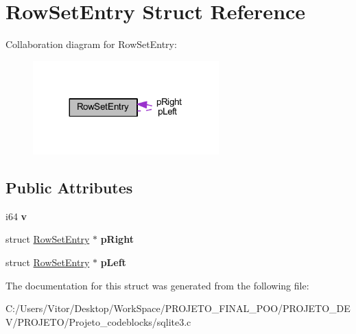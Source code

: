 \hypertarget{struct_row_set_entry}{\section{Row\-Set\-Entry Struct Reference}
\label{struct_row_set_entry}
}


Collaboration diagram for Row\-Set\-Entry\-:\nopagebreak
\begin{figure}[H]
\begin{center}
\leavevmode
\includegraphics[width=203pt]{struct_row_set_entry__coll__graph}
\end{center}
\end{figure}
\subsection*{Public Attributes}
\begin{DoxyCompactItemize}
\item 
\hypertarget{struct_row_set_entry_ac72670935246f1bff5e4d96703574071}{i64 {\bfseries v}}\label{struct_row_set_entry_ac72670935246f1bff5e4d96703574071}

\item 
\hypertarget{struct_row_set_entry_ac39c09525dd24f42af522587d1bc5026}{struct \hyperlink{struct_row_set_entry}{Row\-Set\-Entry} $\ast$ {\bfseries p\-Right}}\label{struct_row_set_entry_ac39c09525dd24f42af522587d1bc5026}

\item 
\hypertarget{struct_row_set_entry_a59365203c30ce782ae38e534c90db14b}{struct \hyperlink{struct_row_set_entry}{Row\-Set\-Entry} $\ast$ {\bfseries p\-Left}}\label{struct_row_set_entry_a59365203c30ce782ae38e534c90db14b}

\end{DoxyCompactItemize}


The documentation for this struct was generated from the following file\-:\begin{DoxyCompactItemize}
\item 
C\-:/\-Users/\-Vitor/\-Desktop/\-Work\-Space/\-P\-R\-O\-J\-E\-T\-O\-\_\-\-F\-I\-N\-A\-L\-\_\-\-P\-O\-O/\-P\-R\-O\-J\-E\-T\-O\-\_\-\-D\-E\-V/\-P\-R\-O\-J\-E\-T\-O/\-Projeto\-\_\-codeblocks/sqlite3.\-c\end{DoxyCompactItemize}
